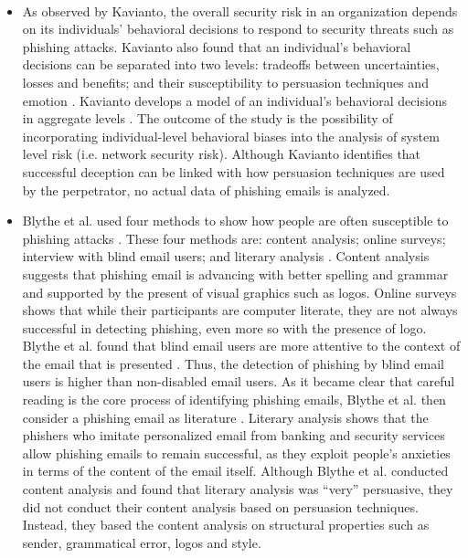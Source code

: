 %
\ 
%
\begin{itemize}
\item As observed by Kavianto, the overall security risk in an organization
depends on its individuals' behavioral decisions to respond to security
threats such as phishing attacks. Kavianto also found that an individual's
behavioral decisions can be separated into two levels: tradeoffs between
uncertainties, losses and benefits; and their susceptibility to persuasion
techniques \citep{cialdini:2001} and emotion \citep{kaivanto2014effect}.
Kavianto develops a model of an individual's behavioral decisions
in aggregate levels \citep{kaivanto2014effect}. The outcome of the
study is the possibility of incorporating individual-level behavioral
biases into the analysis of system level risk (i.e. network security
risk). Although Kavianto identifies that successful deception can
be linked with how persuasion techniques are used by the perpetrator,
no actual data of phishing emails is analyzed.
\item Blythe et al. used four methods to show how people are often susceptible
to phishing attacks \citep{blythe2011f}. These four methods are:
content analysis; online surveys; interview with blind email users;
and literary analysis \citep{blythe2011f}. Content analysis suggests
that phishing email is advancing with better spelling and grammar
and supported by the present of visual graphics such as logos. Online
surveys shows that while their participants are computer literate,
they are not always successful in detecting phishing, even more so
with the presence of logo. Blythe et al. found that blind email users
are more attentive to the context of the email that is presented \citep{blythe2011f}.
Thus, the detection of phishing by blind email users is higher than
non-disabled email users. As it became clear that careful reading
is the core process of identifying phishing emails, Blythe et al.
then consider a phishing email as literature \citep{blythe2011f}.
Literary analysis shows that the phishers who imitate personalized
email from banking and security services allow phishing emails to
remain successful, as they exploit people\textquoteright s anxieties
in terms of the content of the email itself. Although Blythe et al.
conducted content analysis and found that literary analysis was ``very''
persuasive, they did not conduct their content analysis based on persuasion
techniques. Instead, they based the content analysis on structural
properties such as sender, grammatical error, logos and style.

\end{itemize}
